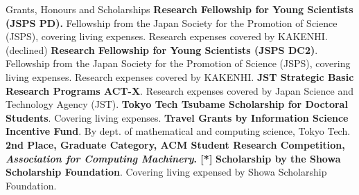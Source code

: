 \begin{rubric}{Grants, Honours and Scholarships}
  \entry*[2023] \textbf{Research Fellowship for Young Scientists (JSPS PD).}
  Fellowship from the Japan Society for the Promotion of Science (JSPS), covering
  living expenses. Research expenses covered by KAKENHI. (declined)
  \entry*[2021] \textbf{Research Fellowship for Young Scientists (JSPS DC2)}.
  Fellowship from the Japan Society for the Promotion of Science (JSPS), covering
  living expenses. Research expenses covered by KAKENHI.
  \entry*[2020] \textbf{JST Strategic Basic Research Programs ACT-X}. Research
  expenses covered by Japan Science and Technology Agency (JST).
  \entry*[2020] \textbf{Tokyo Tech Tsubame Scholarship for Doctoral
    Students}. Covering living expenses.
  \entry*[2019] \textbf{Travel Grants by Information Science Incentive Fund}. By
  dept. of mathematical and computing science, Tokyo Tech.
  \entry*[2019] \textbf{2nd Place, Graduate Category, ACM Student Research
    Competition, \textit{Association for Computing Machinery}. [*]}
  \entry*[2014] \textbf{Scholarship by the Showa Scholarship Foundation}. Covering
  living expensed by Showa Scholarship Foundation.
\end{rubric}
